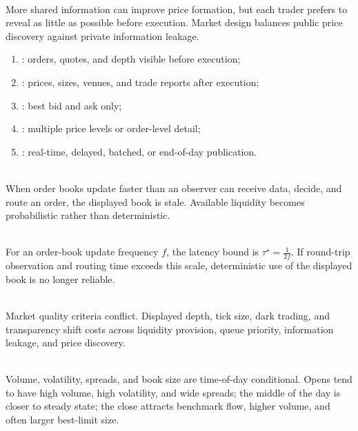\documentclass[a4paper,oneside,openany]{book}
\begin{document}
\begin{caveat} \\
More shared information can improve price formation, but each trader prefers to reveal as little as possible before execution. Market design balances public price discovery against private information leakage.
\end{caveat}

\begin{taxonomy} 
\begin{enumerate}[label=\roman*.]
\setlength{\itemsep}{0pt}
\item {}: orders, quotes, and depth visible before execution;
\item {}: prices, sizes, venues, and trade reports after execution;
\item {}: best bid and ask only;
\item {}: multiple price levels or order-level detail;
\item {}: real-time, delayed, batched, or end-of-day publication.
\end{enumerate}
\end{taxonomy}

\begin{caveat} \\
When order books update faster than an observer can receive data, decide, and route an order, the displayed book is stale. Available liquidity becomes probabilistic rather than deterministic.
\end{caveat}

\begin{definition} \\
For an order-book update frequency $f$, the latency bound is $\tau^\star=\frac{1}{2f}$. If round-trip observation and routing time exceeds this scale, deterministic use of the displayed book is no longer reliable.
\end{definition}

\begin{caveat} \\
Market quality criteria conflict. Displayed depth, tick size, dark trading, and transparency shift costs across liquidity provision, queue priority, information leakage, and price discovery.
\end{caveat}

\begin{empiricalfinding} \\
Volume, volatility, spreads, and book size are time-of-day conditional. Opens tend to have high volume, high volatility, and wide spreads; the middle of the day is closer to steady state; the close attracts benchmark flow, higher volume, and often larger best-limit size.
\end{empiricalfinding}
\end{document}
